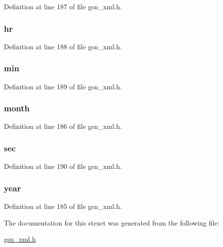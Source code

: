 Definition at line 187 of file gsn\_\-xml.h.

\hypertarget{a00433_a5dff479f0f1395e93a28dd0c7b1335b2}{
\subsubsection[{hr}]{ {\bf hr}}}
\label{a00433_a5dff479f0f1395e93a28dd0c7b1335b2}


Definition at line 188 of file gsn\_\-xml.h.

\hypertarget{a00433_afcd3b3e11f0b83ec71d50a827e42d9db}{
\subsubsection[{min}]{ {\bf min}}}
\label{a00433_afcd3b3e11f0b83ec71d50a827e42d9db}


Definition at line 189 of file gsn\_\-xml.h.

\hypertarget{a00433_a9a7060ed27a8fc1c0a801ca792fbc955}{
\subsubsection[{month}]{ {\bf month}}}
\label{a00433_a9a7060ed27a8fc1c0a801ca792fbc955}


Definition at line 186 of file gsn\_\-xml.h.

\hypertarget{a00433_a2edad25d34a288a33b77f09dfc71faa5}{
\subsubsection[{sec}]{ {\bf sec}}}
\label{a00433_a2edad25d34a288a33b77f09dfc71faa5}


Definition at line 190 of file gsn\_\-xml.h.

\hypertarget{a00433_a15cf81be0bc3b33c7cc971ed1a815c74}{
\subsubsection[{year}]{ {\bf year}}}
\label{a00433_a15cf81be0bc3b33c7cc971ed1a815c74}


Definition at line 185 of file gsn\_\-xml.h.



The documentation for this struct was generated from the following file:\begin{DoxyCompactItemize}
\item 
\hyperlink{a00616}{gsn\_\-xml.h}\end{DoxyCompactItemize}

